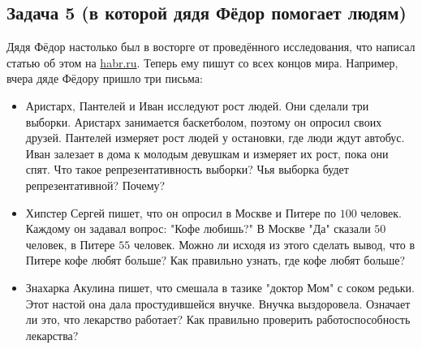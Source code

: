 \documentclass[12pt, a4paper, oneside]{article}
\begin{document}

\subsection*{Задача 5 (в которой  дядя Фёдор помогает людям)}

Дядя Фёдор настолько был в восторге от проведённого исследования, что написал статью об этом на \url{habr.ru}. Теперь ему пишут со всех концов мира. Например, вчера дяде Фёдору пришло три письма: 

\begin{itemize}
	\item Аристарх, Пантелей и Иван исследуют рост людей. Они сделали три выборки. Аристарх занимается баскетболом, поэтому он опросил своих друзей. Пантелей измеряет рост людей у остановки, где люди ждут автобус. Иван залезает в дома к молодым девушкам и измеряет их рост, пока они спят. Что такое репрезентативность выборки? Чья выборка будет репрезентативной? Почему? 
	
	\item Хипстер Сергей пишет, что он опросил в Москве и Питере по $100$ человек. Каждому он задавал вопрос: "Кофе любишь?"  В Москве "Да" сказали $50$ человек, в Питере $55$ человек. Можно ли исходя из этого сделать вывод, что в Питере кофе любят больше? Как правильно узнать, где кофе любят больше? 
	
	\item Знахарка Акулина пишет, что смешала в тазике  "доктор Мом" с соком редьки. Этот настой она дала простудившейся внучке. Внучка выздоровела. Означает ли это, что лекарство работает? Как правильно проверить работоспособность лекарства? 
\end{itemize}
\end{document}

